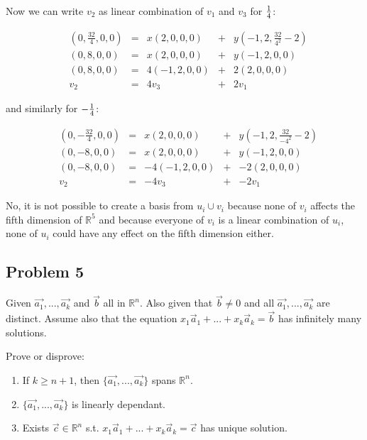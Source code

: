 \documentclass[11pt]{article}
\begin{document}
Now we can write $v_2$ as linear combination of $v_1$ and $v_3$ for ${{1}\over{4}}$:

\begin{equation*}
\begin{alignedat}{5}
 & (0, \frac{32}{4}, 0, 0) &{}={}& x(2, 0, 0, 0)  &{}+{}& y(-1, 2, \frac{32}{4^2} - 2) \\
 & (0, 8, 0, 0)            &{}={}& x(2, 0, 0, 0)  &{}+{}& y(-1, 2, 0, 0) \\
 & (0, 8, 0, 0)            &{}={}& 4(-1, 2, 0, 0) &{}+{}& 2(2, 0, 0, 0)\\
 & v_2                     &{}={}& 4v_3           &{}+{}& 2v_1
\end{alignedat}
\end{equation*}

and similarly for $-{{1}\over{4}}$:

\begin{equation*}
\begin{alignedat}{5}
 & (0, -\frac{32}{4}, 0, 0) &{}={}& x(2, 0, 0, 0)   &{}+{}& y(-1, 2, \frac{32}{-4^2} - 2) \\
 & (0, -8, 0, 0)            &{}={}& x(2, 0, 0, 0)   &{}+{}& y(-1, 2, 0, 0) \\
 & (0, -8, 0, 0)            &{}={}& -4(-1, 2, 0, 0) &{}+{}& -2(2, 0, 0, 0)\\
 & v_2                      &{}={}& -4v_3           &{}+{}& -2v_1
\end{alignedat}
\end{equation*}

No, it is not possible to create a basis from $u_i \cup v_i$ because none of $v_i$ affects
the fifth dimension of $\mathbb{R}^5$ and because everyone of $v_i$ is a linear combination
of $u_i$, none of $u_i$ could have any effect on the fifth dimension either.

\subsection{Problem 5}
\label{sec-1-5}
Given $\vec{a_1}, ..., \vec{a_k}$ and $\vec{b}$ all in $\mathbb{R}^n$.  Also
given that $\vec{b} \neq 0$ and all $\vec{a_1}, ..., \vec{a_k}$ are distinct.
Assume also that the equation $x_1\vec{a}_1+...+x_k\vec{a}_k=\vec{b}$ has
infinitely many solutions.

Prove or disprove:

\begin{enumerate}
\item If $k \geq n+1$, then $\{\vec{a_1}, ..., \vec{a_k}\}$ spans $\mathbb{R}^n$.
\item $\{\vec{a_1}, ..., \vec{a_k}\}$ is linearly dependant.
\item Exists $\vec{c} \in \mathbb{R}^n$ s.t. 
      $x_1\vec{a}_1+...+x_k\vec{a}_k=\vec{c}$ has unique solution.
\end{enumerate}
\end{document}
